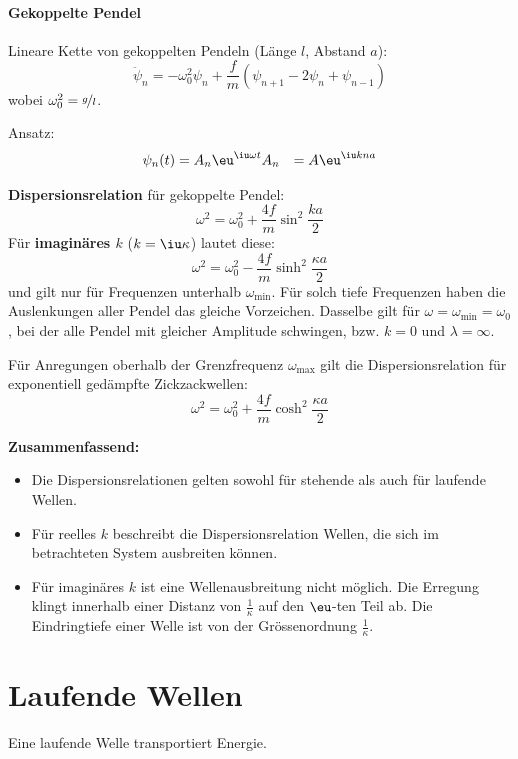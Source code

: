 		\paragraph{Gekoppelte Pendel} %
			Lineare Kette von gekoppelten Pendeln (Länge $l$, Abstand $a$):
			\[
				\ddot \psi_n = -\omega_0^2 \psi_n + \frac{f}{m}(\psi_{n+1} - 2\psi_n + \psi_{n-1})
			\]
			wobei $\omega_0^2 = \nicefrac gl$.
			
			Ansatz:
			\begin{align*}
				\psi_n(t) &= A_n \eu^{\iu\omega t}
				A_n &= A \eu^{\iu k n a}
			\end{align*}
			
			\textbf{Dispersionsrelation} für gekoppelte Pendel:
			\[
				\omega^2 = \omega_0^2 + \frac{4f}{m} \sin^2 \frac{ka}{2}
			\]
			Für \textbf{imaginäres $k$} ($k = \iu\kappa$) lautet diese:
			\[
				\omega^2 = \omega_0^2 - \frac{4f}{m} \sinh^2 \frac{\kappa a}{2}
			\]
			und gilt nur für Frequenzen unterhalb $\omega_\text{min}$. Für solch tiefe Frequenzen haben die Auslenkungen aller Pendel das gleiche Vorzeichen. Dasselbe gilt für $\omega = \omega_\text{min} = \omega_0$, bei der alle Pendel mit gleicher Amplitude schwingen, bzw. $k = 0$ und $\lambda = \infty$.
			
			Für Anregungen oberhalb der Grenzfrequenz $\omega_\text{max}$ gilt die Dispersionsrelation für exponentiell gedämpfte Zickzackwellen:
			\[
				\omega^2 = \omega_0^2 + \frac{4f}{m}\cosh^2 \frac{\kappa a}{2}
			\]
			
			\textbf{Zusammenfassend:}
			\begin{itemize}
				\item Die Dispersionsrelationen gelten sowohl für stehende als auch für laufende Wellen.
				\item Für reelles $k$ beschreibt die Dispersionsrelation Wellen, die sich im betrachteten System ausbreiten können.
				\item Für imaginäres $k$ ist eine Wellenausbreitung nicht möglich. Die Erregung klingt innerhalb einer Distanz von $\frac 1 \kappa$ auf den $\eu$-ten Teil ab. Die Eindringtiefe einer Welle ist von der Grössenordnung $\frac 1 \kappa$.
			\end{itemize}
\section{Laufende Wellen} %
	Eine laufende Welle transportiert Energie.
